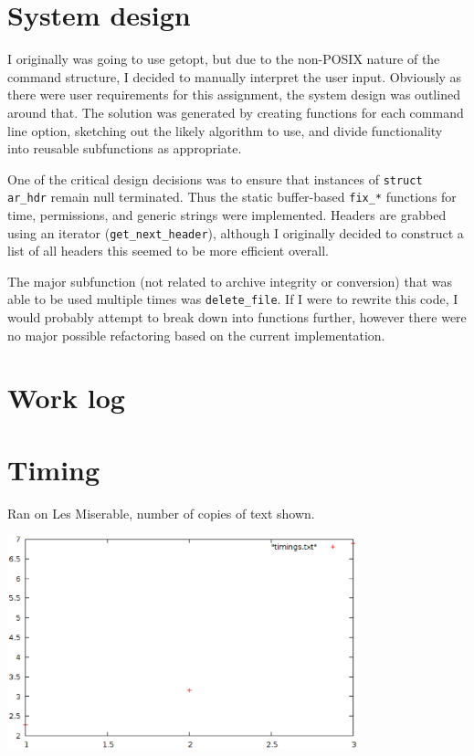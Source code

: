 \documentclass[letterpaper,10pt,titlepage]{article}
\begin{document}
\section{System design}
I originally was going to use getopt, but due to the non-POSIX nature of the command
structure, I decided to manually interpret the user input. Obviously as there were user
requirements for this assignment, the system design was outlined around that. The solution
was generated by creating functions for each command line option, sketching out the likely
algorithm to use, and divide functionality into reusable subfunctions as appropriate.

One of the critical design decisions was to ensure that instances of \verb!struct ar_hdr!
remain null terminated. Thus the static buffer-based \verb!fix_*! functions for
time, permissions, and generic strings were implemented. Headers are grabbed using
an iterator (\verb~get_next_header~), although I originally decided to construct a list
of all headers this seemed to be more efficient overall.

The major subfunction (not related to archive integrity or conversion) that was able to
be used multiple times was \verb!delete_file!. If I were to rewrite this code, I would
probably attempt to break down into functions further, however there were no major possible
refactoring based on the current implementation.

\section{Work log}


\section{Timing}
Ran on Les Miserable, number of copies of text shown.
\begin{center}
\includegraphics[width=4in]{graph.eps}
\end{center}
\end{document}
